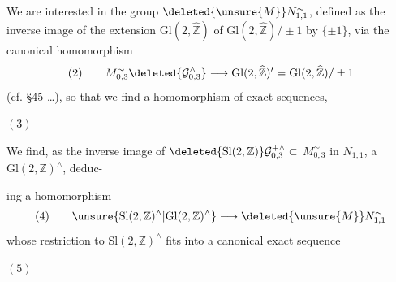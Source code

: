 We are interested in the group $\deleted{\unsure{M}}N_{1,1}^{\sim}$, defined  as the inverse image of the extension $\mathrm{Gl}(2,\widehat{\mathbb Z})$ of $\mathrm{Gl}(2,\widehat{\mathbb Z})/\pm1$ by $\{\pm1\}$, via the canonical homomorphism
\[
(2)\qquad
M_{0,3}^{\sim}\deleted{\mathcal G_{0,3}^{\wedge}}
\longrightarrow\mathrm{Gl}(2,\widehat{\mathbb Z})'
=\mathrm{Gl}(2,\widehat{\mathbb Z})/\pm1
\]
(cf. \S45 \ldots), so that we find a homomorphism of exact sequences,


$(3)$

We find,   as the inverse image of $\deleted{\mathrm{Sl}(2,\mathbb Z)}\mathcal G_{0,3}^{+\wedge}\subset$  $M_{0,3}^{\sim}$ in $N_{1,1}$, a $\mathrm{Gl}(2,\mathbb Z)^\wedge$, deduc-



ing a homomorphism
\[
(4)\qquad
\unsure{\mathrm{Sl}(2,\mathbb Z)^\wedge|\mathrm{Gl}(2,\mathbb Z)^\wedge}
\longrightarrow\deleted{\unsure{M}}N_{1,1}^{\sim}
\]
whose restriction to $\mathrm{Sl}(2,\mathbb Z)^\wedge$ fits  into a canonical exact sequence

$(5)$

